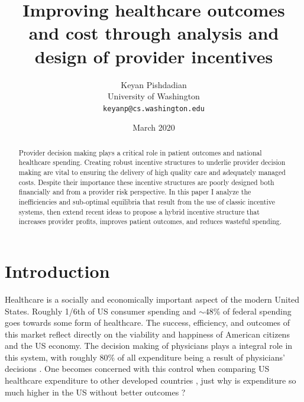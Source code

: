 \documentclass{article}
\begin{document}
\title{Improving healthcare outcomes and cost through analysis and design of provider incentives}
\author{Keyan Pishdadian\\University of Washington\\\texttt{keyanp@cs.washington.edu}}
\date{March 2020}

\maketitle

\begin{abstract}
Provider decision making plays a critical role in patient outcomes and national healthcare spending. Creating robust incentive structures to underlie provider decision making are vital to ensuring the delivery of high quality care and adequately managed costs. Despite their importance these incentive structures are poorly designed both financially and from a provider risk perspective. In this paper I analyze the inefficiencies and sub-optimal equilibria that result from the use of classic incentive systems, then extend recent ideas to propose a hybrid incentive structure that increases provider profits, improves patient outcomes, and reduces wasteful spending.
\end{abstract}

\section{Introduction}
Healthcare is a socially and economically important aspect of the modern United States. Roughly 1/6th of US consumer spending \cite{econharvard} and ${\sim}48$\% of federal spending \cite{federalspend} goes towards some form of healthcare. The success, efficiency, and outcomes of this market reflect directly on the viability and happiness of American citizens and the US economy. The decision making of physicians plays a integral role in this system, with roughly 80\% of all expenditure being a result of physicians' decisions \cite{trust}. One becomes concerned with this control when comparing US healthcare expenditure to other developed countries \cite{econharvard}, just why is expenditure so much higher in the US without better outcomes \cite{acoecon}?
\end{document}
